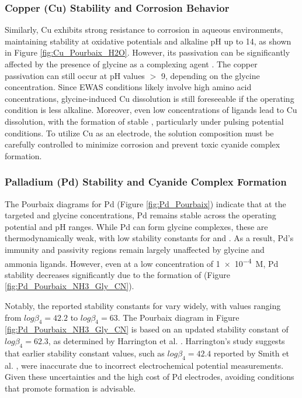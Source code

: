 \documentclass[journal=jacsat,manuscript=article]{achemso}
\begin{document}
\subsubsection{Copper (Cu) Stability and Corrosion Behavior}
Similarly, Cu exhibits strong resistance to corrosion in aqueous environments, maintaining stability at oxidative potentials and alkaline pH up to 14, as shown in Figure \ref{fig:Cu_Pourbaix_H2O}. However, its passivation can be significantly affected by the presence of glycine as a complexing agent \cite{Wang2022ThermodynamicDiagrams,Tripathi2009FundamentalConstituents,Skrypnikova2008PeculiaritiesAdditives,OConnor2018ElectrochemicalSolutions}. The copper passivation can still occur at pH values $>$ 9, depending on the glycine concentration. Since EWAS conditions likely involve high amino acid concentrations, glycine-induced Cu dissolution is still foreseeable if the operating condition is less alkaline. Moreover, even low concentrations of  ligands lead to Cu dissolution, with the formation of stable , particularly under pulsing potential conditions. To utilize Cu as an electrode, the solution composition must be carefully controlled to minimize corrosion and prevent toxic cyanide complex formation.

\subsubsection{Palladium (Pd) Stability and Cyanide Complex Formation} 
The Pourbaix diagrams for Pd (Figure \ref{fig:Pd_Pourbaix}) indicate that at the targeted  and glycine concentrations, Pd remains stable across the operating potential and pH ranges. While Pd can form glycine complexes, these are thermodynamically weak, with low stability constants for \ce{[Pd(Gly)^+]} and \ce{[Pd(Gly)2]}. As a result, Pd’s immunity and passivity regions remain largely unaffected by glycine and ammonia ligands. However, even at a low  concentration of \num{1e-4}~M, Pd stability decreases significantly due to the formation of \ce{[Pd(CN)4^2+]} (Figure \ref{fig:Pd_Pourbaix_NH3_Gly_CN}).

Notably, the reported stability constants for \ce{[Pd(CN)4^2+]} vary widely, with values ranging from $log\beta_4 = 42.2$\cite{Smith1989CriticalConstants} to $log\beta_4 = 63$\cite{Cabbiness1969MacrocyclicComplexes}. The Pourbaix diagram in Figure \ref{fig:Pd_Pourbaix_NH3_Gly_CN} is based on an updated stability constant of $log\beta_4 = 62.3$, as determined by Harrington et al. \cite{Harrington2005DeterminationIon}. Harrington’s study suggests that earlier stability constant values, such as $log\beta_4 = 42.4$ reported by Smith et al. \cite{Smith1989CriticalConstants}, were inaccurate due to incorrect electrochemical potential measurements. Given these uncertainties and the high cost of Pd electrodes, avoiding conditions that promote \ce{[Pd(CN)4^2+]} formation is advisable.
\end{document}

